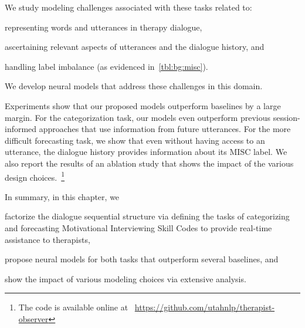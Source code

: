 We study modeling challenges associated with these tasks related to:
\begin{inparaenum}[(1)]
\item representing words and utterances in therapy dialogue,
\item ascertaining relevant aspects of utterances and the dialogue
  history, and
\item handling label imbalance (as evidenced in~\autoref{tbl:bg:misc}).
\end{inparaenum}
We develop neural models that address these challenges in this
domain.

Experiments show that our proposed models outperform baselines by a
large margin. For the categorization task, our models even outperform
previous session-informed approaches that use information from future
utterances. For the more difficult forecasting task, we show that even
without having access to an utterance, the dialogue history provides
information about its MISC label.  We also report the results of an
ablation study that shows the impact of the various design
choices.~\footnote{The code is available online at
  ~\url{https://github.com/utahnlp/therapist-observer}}

In summary, in this chapter, we
\begin{inparaenum}[(1)]
\item factorize the dialogue sequential structure via defining the tasks
  of categorizing and forecasting Motivational Interviewing Skill
  Codes to provide real-time assistance to therapists,
\item propose neural models for both tasks that outperform several
  baselines, and
\item show the impact of various modeling choices via extensive
  analysis.
\end{inparaenum}















